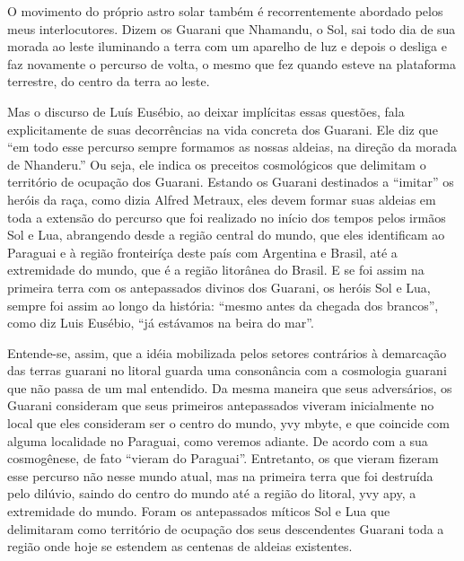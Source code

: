 \documentclass{article}
\begin{document}
O movimento do pr\'oprio astro solar tamb\'em \'e recorrentemente
abordado pelos meus interlocutores. Dizem os Guarani que Nhamandu, o
Sol, sai todo dia de sua morada ao leste iluminando a terra com um
aparelho de luz e depois o desliga e faz novamente o percurso de volta,
o mesmo que fez quando esteve na plataforma terrestre, do centro da
terra ao leste.

Mas o discurso de Lu\'is Eus\'ebio, ao deixar impl\'icitas essas
quest\~oes, fala explicitamente de suas decorr\^encias na vida concreta
dos Guarani. Ele diz que {\textquotedblleft}em todo esse percurso
sempre formamos as nossas aldeias, na dire\c{c}\~ao da morada de
Nhanderu.{\textquotedblright} Ou seja, ele indica os preceitos
cosmol\'ogicos que delimitam o territ\'orio de ocupa\c{c}\~ao dos
Guarani. Estando os Guarani destinados a
{\textquotedblleft}imitar{\textquotedblright} os her\'ois da ra\c{c}a,
como dizia Alfred Metraux, eles devem formar suas aldeias em toda a
extens\~ao do percurso que foi realizado no in\'icio dos tempos pelos
irm\~aos Sol e Lua, abrangendo desde a regi\~ao central do mundo, que
eles identificam ao Paraguai e \`a regi\~ao fronteir\'i\c{c}a deste
pa\'is com Argentina e Brasil, at\'e a extremidade do mundo, que \'e a
regi\~ao litor\^anea do Brasil. E se foi assim na primeira terra com os
antepassados divinos dos Guarani, os her\'ois Sol e Lua, sempre foi
assim ao longo da hist\'oria: {\textquotedblleft}mesmo antes da chegada
dos brancos{\textquotedblright}, como diz Luis Eus\'ebio,
{\textquotedblleft}j\'a est\'avamos na beira do
mar{\textquotedblright}.

Entende-se, assim, que a id\'eia mobilizada pelos setores contr\'arios
\`a demarca\c{c}\~ao das terras guarani no litoral guarda uma
conson\^ancia com a cosmologia guarani que n\~ao passa de um mal
entendido. Da mesma maneira que seus advers\'arios, os Guarani
consideram que seus primeiros antepassados viveram inicialmente no
local que eles consideram ser o centro do mundo, yvy mbyte, e que
coincide com alguma localidade no Paraguai, como veremos adiante. De
acordo com a sua cosmog\^enese, de fato {\textquotedblleft}vieram do
Paraguai{\textquotedblright}. Entretanto, os que vieram fizeram esse
percurso n\~ao nesse mundo atual, mas na primeira terra que foi
destru\'ida pelo dil\'uvio, saindo do centro do mundo at\'e a regi\~ao
do litoral, yvy apy, a extremidade do mundo. Foram os antepassados
m\'iticos Sol e Lua que delimitaram como territ\'orio de ocupa\c{c}\~ao
dos seus descendentes Guarani toda a regi\~ao onde hoje se estendem as
centenas de aldeias existentes.
\end{document}
